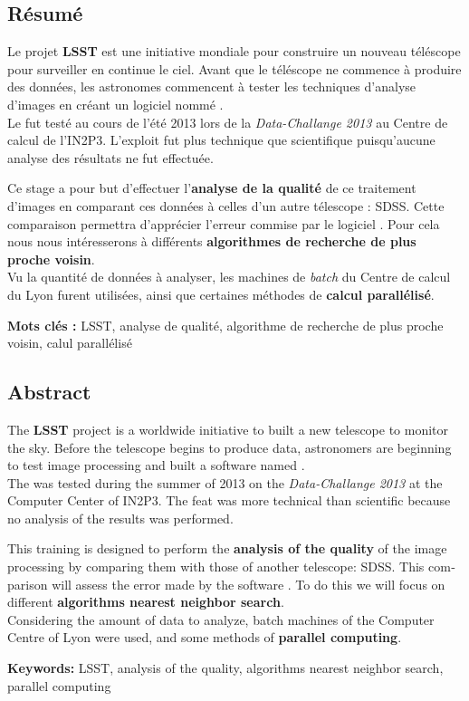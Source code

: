 \documentclass[a4paper, 11pt]{article}
\begin{document}
\subsection*{Résumé}

Le projet \textbf{LSST} est une initiative mondiale pour construire un nouveau téléscope pour surveiller en continue le ciel. Avant que le téléscope ne commence à produire des données, les astronomes commencent à tester les techniques d'analyse d'images en créant un logiciel nommé \stack{}. \\
Le \stack{} fut testé au cours de l'été 2013 lors de la \emph{Data-Challange 2013} au Centre de calcul de l'IN2P3. L'exploit fut plus technique que scientifique puisqu'aucune analyse des résultats ne fut effectuée.

Ce stage a pour but d'effectuer l'\textbf{analyse de la qualité} de ce traitement d'images en comparant ces données à celles d'un autre télescope : SDSS. Cette comparaison permettra d'apprécier l'erreur commise par le logiciel \stack{}. Pour cela nous nous intéresserons à différents \textbf{algorithmes de recherche de plus proche voisin}.\\
Vu la quantité de données à analyser, les machines de \emph{batch} du Centre de calcul du Lyon furent utilisées, ainsi que certaines méthodes de \textbf{calcul parallélisé}.

\vspace{0.75em}
\textbf{Mots clés :} LSST, analyse de qualité, algorithme de recherche de plus proche voisin, calul parallélisé

\subsection*{Abstract}

\begin{otherlanguage}{english}
The \textbf{LSST} project is a worldwide initiative to built a new telescope to monitor the sky. Before the telescope begins to produce data, astronomers are beginning to test image processing and built a software named \stack{}. \\
The \stack{} was tested during the summer of 2013 on the \emph{Data-Challange 2013} at the Computer Center of IN2P3. The feat was more technical than scientific because no analysis of the results was performed.

This training  is designed to perform the \textbf{analysis of the quality} of the image processing by comparing them with those of another telescope: SDSS. This comparison will assess the error made by the software \stack{}. To do this we will focus on different \textbf{algorithms nearest neighbor search}. \\
Considering the amount of data to analyze, batch machines of the Computer Centre of Lyon were used, and some methods of \textbf{parallel computing}.

\vspace{0.75em}
\textbf{Keywords:} LSST, analysis of the quality, algorithms nearest neighbor search, parallel computing
\end{otherlanguage}
\end{document}
